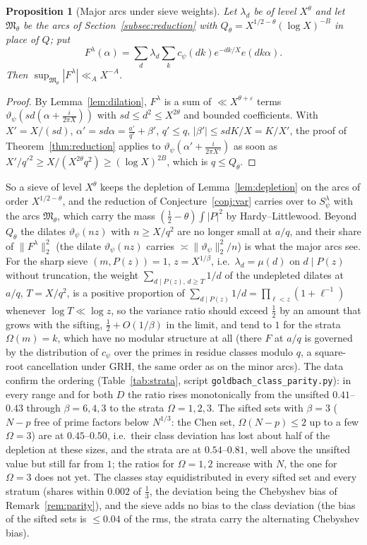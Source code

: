 ﻿\documentclass[11pt]{amsart}
\newtheorem{proposition}[theorem]{Proposition}
\theoremstyle{remark}
\newcommand{\vt}{\vartheta}
\newcommand{\e}{\varepsilon}
\begin{document}
\begin{proposition}[Major arcs under sieve weights]\label{prop:siftedarcs}
Let $\lambda_d$ be of level $X^\theta$ and let $\mathfrak M_\theta$ be the arcs of Section~\ref{subsec:reduction} with $Q_\theta=X^{1/2-\theta}(\log X)^{-B}$ in place of $Q$; put
\[
F^\lambda(\alpha)=\sum_d\lambda_d\sum_kc_\psi(dk)e^{-dk/X}e(dk\alpha).
\] Then $\sup_{\mathfrak M_\theta}|F^\lambda|\ll_AX^{-A}$.
\end{proposition}
\begin{proof}
By Lemma~\ref{lem:dilation}, $F^\lambda$ is a sum of $\ll X^{\theta+\e}$ terms $\vt_\psi(sd(\alpha+\frac i{2\pi X}))$ with $sd\le d^2\le X^{2\theta}$ and bounded coefficients. With $X'=X/(sd)$, $\alpha'=sd\alpha=\frac{a'}{q'}+\beta'$, $q'\le q$, $|\beta'|\le sdK/X=K/X'$, the proof of Theorem~\ref{thm:reduction} applies to $\vt_\psi(\alpha'+\frac i{2\pi X'})$ as soon as $X'/q'^2\ge X/(X^{2\theta}q^2)\ge(\log X)^{2B}$, which is $q\le Q_\theta$.
\end{proof}

So a sieve of level $X^\theta$ keeps the depletion of Lemma~\ref{lem:depletion} on the arcs of order $X^{1/2-\theta}$, and the reduction of Conjecture~\ref{conj:var} carries over to $S^\lambda_\psi$ with the arcs $\mathfrak M_\theta$, which carry the mass $(\frac12-\theta)\int|P|^2$ by Hardy--Littlewood. Beyond $Q_\theta$ the dilates $\vt_\psi(nz)$ with $n\ge X/q^2$ are no longer small at $a/q$, and their share of $\|F^\lambda\|_2^2$ (the dilate $\vt_\psi(nz)$ carries $\asymp\|\vt_\psi\|_2^2/n$) is what the major arcs see. For the sharp sieve $(m,P(z))=1$, $z=X^{1/\beta}$, i.e.\ $\lambda_d=\mu(d)$ on $d\mid P(z)$ without truncation, the weight $\sum_{d\mid P(z),\,d\ge T}1/d$ of the undepleted dilates at $a/q$, $T=X/q^2$, is a positive proportion of $\sum_{d\mid P(z)}1/d=\prod_{\ell<z}(1+\ell^{-1})$ whenever $\log T\ll\log z$, so the variance ratio should exceed $\frac12$ by an amount that grows with the sifting, $\frac12+O(1/\beta)$ in the limit, and tend to $1$ for the strata $\Omega(m)=k$, which have no modular structure at all (there $F$ at $a/q$ is governed by the distribution of $c_\psi$ over the primes in residue classes modulo $q$, a square-root cancellation under GRH, the same order as on the minor arcs). The data confirm the ordering (Table~\ref{tab:strata}, script \texttt{goldbach\_class\_parity.py}): in every range and for both $D$ the ratio rises monotonically from the unsifted $0.41$--$0.43$ through $\beta=6,4,3$ to the strata $\Omega=1,2,3$. The sifted sets with $\beta=3$ ($N-p$ free of prime factors below $N^{1/3}$: the Chen set, $\Omega(N-p)\le2$ up to a few $\Omega=3$) are at $0.45$--$0.50$, i.e.\ their class deviation has lost about half of the depletion at these sizes, and the strata are at $0.54$--$0.81$, well above the unsifted value but still far from $1$; the ratios for $\Omega=1,2$ increase with $N$, the one for $\Omega=3$ does not yet. The classes stay equidistributed in every sifted set and every stratum (shares within $0.002$ of $\frac13$, the deviation being the Chebyshev bias of Remark~\ref{rem:parity}), and the sieve adds no bias to the class deviation (the bias of the sifted sets is $\le0.04$ of the rms, the strata carry the alternating Chebyshev bias).
\end{document}
